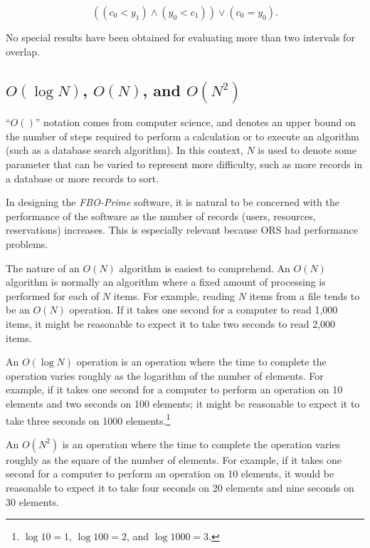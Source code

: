 \documentclass[letterpaper,10pt,titlepage]{article}
\newcommand{\productbasename}{FBO-Prime}
\begin{document}
\begin{equation}
\label{eq:stbg0:sdov0:02}
((c_0 < y_1) \wedge (y_0 < c_1)) \vee (c_0 = y_0) .
\end{equation}

No special results have been obtained for evaluating more than two intervals for
overlap.



\subsection[\mbox{\protect$O(\log N)$}, \mbox{\protect$O(N)$}, and \mbox{\protect$O(N^2)$}]
           {\mbox{\protect\boldmath$O(\log N)$}, 
            \mbox{\protect\boldmath$O(N)$}, and \mbox{\protect\boldmath$O(N^2)$}}
\label{stbg0:sonn0}

``$O()$'' 
notation comes from computer science, and denotes an upper bound
on the number of steps required to perform a calculation or to execute
an algorithm (such as a database search algorithm)\@.  In this context, $N$ is
used to denote some parameter that can be varied to represent more difficulty,
such as more records in a database or more records to sort.

In designing the \emph{\productbasename{}} software, it is natural to be
concerned with the performance of the software as the number of records
(users, resources, reservations) increases.  This is especially relevant
because ORS had performance problems.

The nature of an $O(N)$ algorithm is easiest to comprehend.
An $O(N)$ algorithm is normally an algorithm where a fixed amount of processing
is performed for each of $N$ items.  For example, reading $N$ items from a file
tends to be an $O(N)$ operation.  If it takes one second for a computer to
read 1,000 items, it might be reasonable to expect it to take two seconds
to read 2,000 items.

An $O(\log N)$ operation is an operation where the time to complete
the operation varies roughly as the logarithm of the number of elements.
For example, if it takes one second for a computer to perform an operation
on 10 elements and two seconds on 100 elements; it might be reasonable to
expect it to take three seconds on 1000 elements.\footnote{$\log 10 = 1$, 
$\log 100 = 2$, and $\log 1000 = 3$.}

An $O(N^2)$ is an operation where the time to complete the operation varies roughly
as the square of the number of elements.  For example, if it takes one second for 
a computer to perform an operation on 10 elements, it would be reasonable to expect
it to take four seconds on 20 elements and nine seconds on 30 elements.
\end{document}
